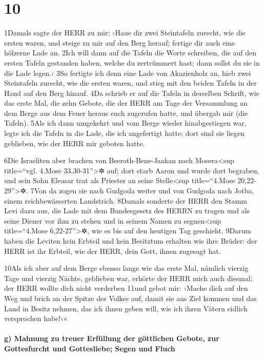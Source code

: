 \hypertarget{section-9}{%
\section{10}\label{section-9}}

1Damals sagte der HERR zu mir: ›Haue dir zwei Steintafeln zurecht, wie
die ersten waren, und steige zu mir auf den Berg herauf; fertige dir
auch eine hölzerne Lade an. 2Ich will dann auf die Tafeln die Worte
schreiben, die auf den ersten Tafeln gestanden haben, welche du
zertrümmert hast; dann sollst du sie in die Lade legen.‹ 3So fertigte
ich denn eine Lade von Akazienholz an, hieb zwei Steintafeln zurecht,
wie die ersten waren, und stieg mit den beiden Tafeln in der Hand auf
den Berg hinauf. 4Da schrieb er auf die Tafeln in derselben Schrift, wie
das erste Mal, die zehn Gebote, die der HERR am Tage der Versammlung an
dem Berge aus dem Feuer heraus euch zugerufen hatte, und übergab mir
(die Tafeln). 5Als ich dann umgekehrt und vom Berge wieder
hinabgestiegen war, legte ich die Tafeln in die Lade, die ich
angefertigt hatte; dort sind sie liegen geblieben, wie der HERR mir
geboten hatte.

6Die Israeliten aber brachen von Beeroth-Bene-Jaakan nach
Mosera\textless sup title=``vgl. 4.Mose 33,30-31''\textgreater✲ auf;
dort starb Aaron und wurde dort begraben, und sein Sohn Eleasar trat als
Priester an seine Stelle\textless sup title=``4.Mose
20,22-29''\textgreater✲. 7Von da zogen sie nach Gudgoda weiter und von
Gudgoda nach Jotba, einem reichbewässerten Landstrich. 8Damals sonderte
der HERR den Stamm Levi dazu aus, die Lade mit dem Bundesgesetz des
HERRN zu tragen und als seine Diener vor ihm zu stehen und in seinem
Namen zu segnen\textless sup title=``4.Mose 6,22-27''\textgreater✲, wie
es bis auf den heutigen Tag geschieht. 9Darum haben die Leviten kein
Erbteil und kein Besitztum erhalten wie ihre Brüder: der HERR ist ihr
Erbteil, wie der HERR, dein Gott, ihnen zugesagt hat.

10Als ich aber auf dem Berge ebenso lange wie das erste Mal, nämlich
vierzig Tage und vierzig Nächte, geblieben war, erhörte der HERR mich
auch diesmal; der HERR wollte dich nicht verderben 11und gebot mir:
›Mache dich auf den Weg und brich an der Spitze des Volkes auf, damit
sie ans Ziel kommen und das Land in Besitz nehmen, das ich ihnen geben
will, wie ich ihren Vätern eidlich versprochen habe!‹«

\hypertarget{g-mahnung-zu-treuer-erfuxfcllung-der-guxf6ttlichen-gebote-zur-gottesfurcht-und-gottesliebe-segen-und-fluch}{%
\paragraph{g) Mahnung zu treuer Erfüllung der göttlichen Gebote, zur
Gottesfurcht und Gottesliebe; Segen und
Fluch}\label{g-mahnung-zu-treuer-erfuxfcllung-der-guxf6ttlichen-gebote-zur-gottesfurcht-und-gottesliebe-segen-und-fluch}}

